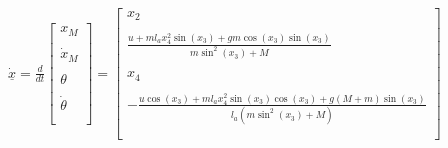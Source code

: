 $\underline{\dot{x}}=\displaystyle\frac{d}{d t}
\begin{bmatrix}
x_M\\\\
\dot{x}_M\\\\
\theta\\\\
\dot{\theta}\\\\
\end{bmatrix}
=
\begin{bmatrix}
x_2\\\\
\displaystyle\frac{u+ml_ax_4^2\sin(x_3)+gm\cos(x_3)\sin(x_3)}{m\sin^2(x_3)+M}\\\\
x_4\\\\
-\displaystyle\frac{u\cos(x_3)+ml_ax_4^2\sin(x_3)\cos(x_3)+g(M+m)\sin(x_3)}{l_a(m\sin^2(x_3)+M)}\\\\
\end{bmatrix}
$
\\\\\\
